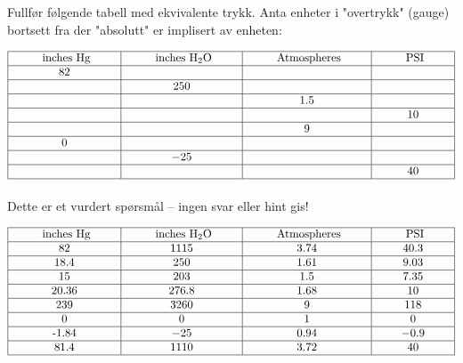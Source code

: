 

Fullfør følgende tabell med ekvivalente trykk.  Anta enheter i "overtrykk" (gauge) bortsett fra der "absolutt" er implisert av enheten:


$$\vbox{\offinterlineskip
\halign{\strut
\vrule \quad\hfil # \ \hfil & 
\vrule \quad\hfil # \ \hfil & 
\vrule \quad\hfil # \ \hfil & 
\vrule \quad\hfil # \ \hfil \vrule \cr
\noalign{\hrule}
%
\hskip 20pt inches Hg \hskip 20pt & \hskip 20pt inches H$_{2}$O \hskip 20pt & \hskip 20pt Atmospheres \hskip 20pt & \hskip 20pt PSI \hskip 20pt \cr
%
\noalign{\hrule}
%
82 &  &  &  \cr
%
\noalign{\hrule}
%
  & 250 &  &  \cr
%
\noalign{\hrule}
%
  &  & 1.5 &  \cr
%
\noalign{\hrule}
%
  &  &  & 10 \cr
%
\noalign{\hrule}
%
  &  & 9 &  \cr
%
\noalign{\hrule}
%
0 &  &  &  \cr
%
\noalign{\hrule}
%
  & $-25$ &  &  \cr
%
\noalign{\hrule}
%
  &  &  & 40 \cr
%
\noalign{\hrule}
} %
}$$ %

\vfil 

\eject






Dette er et vurdert spørsmål -- ingen svar eller hint gis!








$$\vbox{\offinterlineskip
\halign{\strut
\vrule \quad\hfil # \ \hfil & 
\vrule \quad\hfil # \ \hfil & 
\vrule \quad\hfil # \ \hfil & 
\vrule \quad\hfil # \ \hfil \vrule \cr
\noalign{\hrule}
%
\hskip 20pt inches Hg \hskip 20pt & \hskip 20pt inches H$_{2}$O \hskip 20pt & \hskip 20pt Atmospheres \hskip 20pt & \hskip 20pt PSI \hskip 20pt \cr
%
\noalign{\hrule}
%
82 & 1115 & 3.74 & 40.3 \cr
%
\noalign{\hrule}
%
18.4 & 250 & 1.61 & 9.03 \cr
%
\noalign{\hrule}
%
15 & 203 & 1.5 & 7.35 \cr
%
\noalign{\hrule}
%
20.36 & 276.8 & 1.68 & 10 \cr
%
\noalign{\hrule}
%
239 & 3260 & 9 & 118 \cr
%
\noalign{\hrule}
%
0 & 0 & 1 & 0 \cr
%
\noalign{\hrule}
%
-1.84 & $-25$ & 0.94 & $-0.9$ \cr
%
\noalign{\hrule}
%
81.4 & 1110 & 3.72 & 40 \cr
%
\noalign{\hrule}
} %
}$$ %



